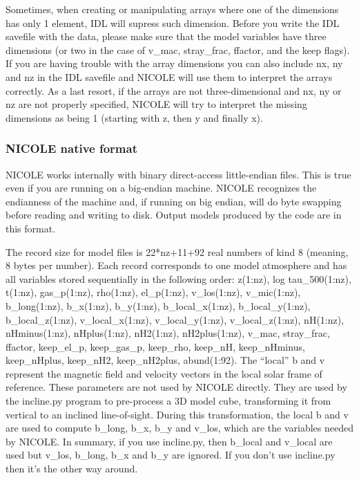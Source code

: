 Sometimes, when creating or manipulating arrays where one of the
dimensions has only 1 element, IDL will supress such dimension. Before
you write the IDL savefile with the data, please make sure that the
model variables have three dimensions (or two in the case of v\_mac,
stray\_frac, ffactor, and the keep flags). If you are having trouble
with the array dimensions you can also include nx, ny and nz in the
IDL savefile and NICOLE will use them to interpret the arrays
correctly. As a last resort, if the arrays are not three-dimensional
and nx, ny or nz are not properly specified, NICOLE will try to
interpret the missing dimensions as being 1 (starting with z, then y
and finally x).

\subsubsection{NICOLE native format}

NICOLE works internally with binary direct-access little-endian
files. This is true even if you are running on a big-endian
machine. NICOLE recognizes the endianness of the machine and, if
running on big endian, will do byte swapping before reading and
writing to disk. Output models produced by the code are in this format.

The record size for model files is 22*nz+11+92 real numbers of kind 8
(meaning, 8 bytes per number). Each record corresponds to one model
atmosphere and has all variables stored sequentially in the following
order: z(1:nz), log tau\_500(1:nz), t(1:nz), gas\_p(1:nz), rho(1:nz),
el\_p(1:nz), v\_los(1:nz), v\_mic(1:nz), b\_long(1:nz), b\_x(1:nz),
b\_y(1:nz), b\_local\_x(1:nz), b\_local\_y(1:nz), b\_local\_z(1:nz),
v\_local\_x(1:nz), v\_local\_y(1:nz), v\_local\_z(1:nz), nH(1:nz),
nHminus(1:nz), nHplus(1:nz), nH2(1:nz), nH2plus(1:nz), v\_mac,
stray\_frac, ffactor, keep\_el\_p, keep\_gas\_p, keep\_rho, 
keep\_nH, keep\_nHminus, keep\_nHplus, keep\_nH2, keep\_nH2plus,
abund(1:92). The ``local'' b and v represent
the magnetic field and velocity vectors in the local solar frame of
reference.  These parameters are not used by NICOLE directly. They are
used by the incline.py program to pre-process a 3D model cube,
transforming it from vertical to an inclined line-of-sight. During
this transformation, the local b and v are used to compute b\_long,
b\_x, b\_y and v\_los, which are the variables needed by NICOLE. In
summary, if you use incline.py, then b\_local and v\_local are used
but v\_los, b\_long, b\_x and b\_y are ignored. If you don't use
incline.py then it's the other way around.

